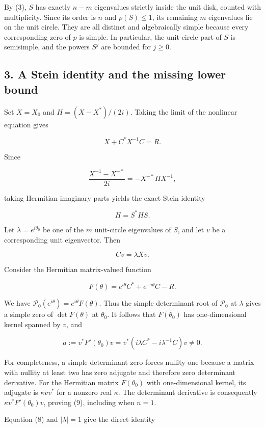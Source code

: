 \documentclass[10pt,a4paper]{article}
\begin{document}
By (3), \(S\) has exactly \(n-m\) eigenvalues strictly inside the unit
disk, counted with multiplicity. Since its order is \(n\) and
\(\rho(S)\leq1\), its remaining \(m\) eigenvalues lie on the unit
circle. They are all distinct and algebraically simple because every
corresponding zero of \(p\) is simple. In particular, the unit-circle
part of \(S\) is semisimple, and the powers \(S^j\) are bounded for
\(j\geq0\).

\subsection{3. A Stein identity and the missing lower
bound}\label{a-stein-identity-and-the-missing-lower-bound}

Set \(X=X_0\) and \(H=(X-X^*)/(2i)\). Taking the limit of the nonlinear
equation gives

\[
X+C^*X^{-1}C=R.
\]

Since

\[
\frac{X^{-1}-X^{-*}}{2i}=-X^{-*}HX^{-1},
\]

taking Hermitian imaginary parts yields the exact Stein identity

\[
H=S^*HS. \tag{7}
\]

Let \(\lambda=e^{i\theta_0}\) be one of the \(m\) unit-circle
eigenvalues of \(S\), and let \(v\) be a corresponding unit eigenvector.
Then

\[
Cv=\lambda Xv. \tag{8}
\]

Consider the Hermitian matrix-valued function

\[
F(\theta)=e^{i\theta}C^*+e^{-i\theta}C-R.
\]

We have \(\mathcal P_0(e^{i\theta})=e^{i\theta}F(\theta)\). Thus the
simple determinant root of \(\mathcal P_0\) at \(\lambda\) gives a
simple zero of \(\det F(\theta)\) at \(\theta_0\). It follows that
\(F(\theta_0)\) has one-dimensional kernel spanned by \(v\), and

\[
a:=v^*F'(\theta_0)v
=v^*(i\lambda C^*-i\lambda^{-1}C)v\ne0. \tag{9}
\]

For completeness, a simple determinant zero forces nullity one because a
matrix with nullity at least two has zero adjugate and therefore zero
determinant derivative. For the Hermitian matrix \(F(\theta_0)\) with
one-dimensional kernel, its adjugate is \(\kappa vv^*\) for a nonzero
real \(\kappa\). The determinant derivative is consequently
\(\kappa v^*F'(\theta_0)v\), proving (9), including when \(n=1\).

Equation (8) and \(|\lambda|=1\) give the direct identity
\end{document}
